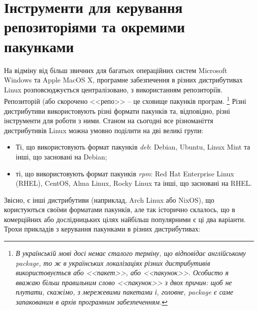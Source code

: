 \documentclass[10pt,a4paper]{fancyhandout}
\begin{document}
\section{Інструменти для керування репозиторіями та окремими пакунками}
На відміну від більш звичних для багатьох операційних систем Microsoft Windows та Apple MacOS X, програмне забезпечення в різних дистрибутивах Linux розповсюджується централізовано, з використанням репозиторіїв. Репозиторій (або скорочено <<репо>> -- це сховище пакунків програм.
\footnote{\textit{В українській мові досі немає сталого терміну, що відповідає англійському package, то ж в українських локалізаціях різних дистрибутивів використовується або <<пакет>>, або <<пакунок>>. Особисто я вважаю більш правильним слово <<пакунок>> з двох причин: щоб не плутати, скажімо, з мережевими пакетами і, головне, package є саме запакованим в архів програмним забезпеченням.}}
Різні дистрибутиви використовують різні формати пакунків та, відповідно, різні інструменти для роботи з ними. Станом на сьогодні все різноманіття дистрибутивів Linux можна умовно поділити на дві великі групи:
\begin{itemize}
	\item Ті, що використовують формат пакунків \textit{deb}: Debian, Ubuntu, Linux Mint та інші, що засновані на Debian;
	\item ті, що використовують формат пакунків \textit{rpm}: Red Hat Enterprise Linux (RHEL), CentOS, Alma Linux, Rocky Linux та інші, що засновані на RHEL.
\end{itemize}
Звісно, є інші дистрибутиви (наприклад, Arch Linux або NixOS), що користуються своїми форматами пакунків, але так історично склалось, що в комерційних або дослідницьких цілях найбільш популярними є ці два варіанти. \\
Трохи прикладів з керування пакунками в різних дистрибутивах: \\
\end{document}
